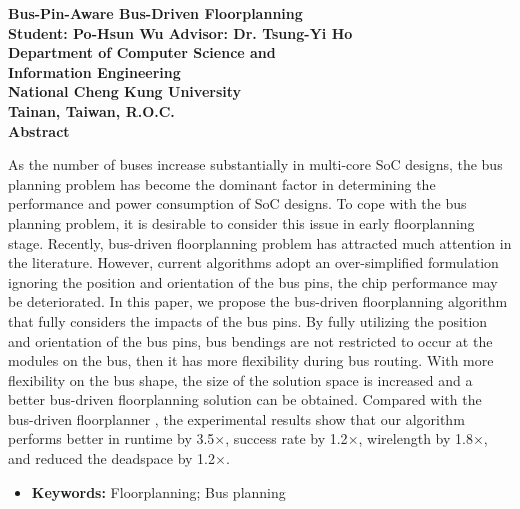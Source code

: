 \begin{center}
\large \textbf{Bus-Pin-Aware Bus-Driven Floorplanning} \\[15mm]
\normalsize \textbf{Student: Po-Hsun Wu \hspace{5mm} Advisor: Dr. Tsung-Yi Ho\\[7mm]}
\normalsize \textbf{Department of Computer Science and\\
                    Information Engineering \\
                    National Cheng Kung University\\
                    Tainan, Taiwan, R.O.C.\\[7mm]}
\large \textbf{Abstract}
\end{center}
\label{abs}

\baselineskip=26pt


As the number of buses increase substantially in multi-core SoC
designs, the bus planning problem has become the dominant factor
in determining the performance and power consumption of SoC
designs. To cope with the bus planning problem, it is desirable to
consider this issue in early floorplanning stage. Recently,
bus-driven floorplanning problem has attracted much attention in
the literature. However, current algorithms adopt an
over-simplified formulation ignoring the position and
orientation of the bus pins, the chip performance may be deteriorated.
In this paper, we propose the bus-driven
floorplanning algorithm that fully considers the impacts of the bus
pins. By fully utilizing the position and orientation of the bus pins,
bus bendings are not restricted to occur at the modules on the bus,
then it has more flexibility during bus routing. With more
flexibility on the bus shape, the size of the solution
space is increased and a better bus-driven floorplanning solution
can be obtained. Compared with the bus-driven
floorplanner \cite{Ma08}, the experimental results show that our
algorithm performs better in runtime by 3.5$\times$, success rate
by 1.2$\times$, wirelength by 1.8$\times$, and reduced the
deadspace by 1.2$\times$.


\begin{itemize}
\item {\bf Keywords:} Floorplanning; Bus planning

\end{itemize}
